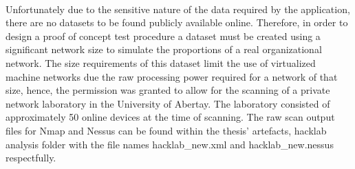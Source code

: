 \paragraph{}Unfortunately due to the sensitive nature of the data required by the application, there are no datasets to be found publicly available online. Therefore, in order to design a proof of concept test procedure a dataset must be created using a significant network size to simulate the proportions of a real organizational network. The size requirements of this dataset limit the use of virtualized machine networks due the raw processing power required for a network of that size, hence, the permission was granted to allow for the scanning of a private network laboratory in the University of Abertay. The laboratory consisted of approximately 50 online devices at the time of scanning. The raw scan output files for Nmap and Nessus can be found within the thesis’ artefacts, hacklab analysis folder with the file names hacklab\_new.xml and hacklab\_new.nessus respectfully.

